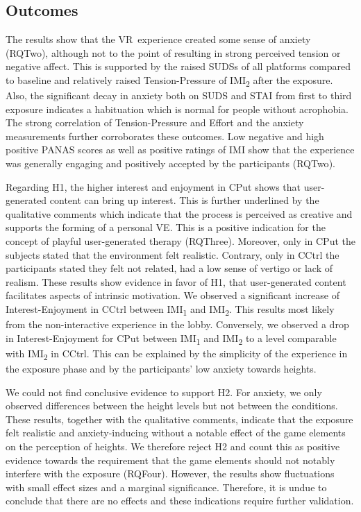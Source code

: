 \subsection{Outcomes}
The results show that the \ac{VR}~experience created some sense of anxiety (\acl{RQTwo}), although not to the point of resulting in strong perceived tension or negative affect.
This is supported by the raised SUDSs of all platforms compared to baseline and relatively raised Tension-Pressure of IMI\textsubscript{2} after the exposure.
Also, the significant decay in anxiety both on SUDS and STAI from first to third exposure indicates a habituation which is normal for people without acrophobia. 
The strong correlation of Tension-Pressure and Effort and the anxiety measurements further corroborates these outcomes.
Low negative and high positive PANAS scores as well as positive ratings of IMI show that the experience was generally engaging and positively accepted by the participants (\acl{RQTwo}).

Regarding H1, the higher interest and enjoyment in \acl{CPut} shows that user-generated content can bring up interest. This is further underlined by the qualitative comments which indicate that the process is perceived as creative and supports the forming of a personal \ac{VE}. This is a positive indication for the concept of playful user-generated therapy (\acl{RQThree}).
Moreover, only in \acl{CPut} the subjects stated that the environment felt realistic. Contrary, only in \acl{CCtrl} the participants stated they felt not related, had a low sense of vertigo or lack of realism.
These results show evidence in favor of H1, that user-generated content facilitates aspects of intrinsic motivation.
We observed a significant increase of Interest-Enjoyment in \acl{CCtrl} between IMI\textsubscript{1} and IMI\textsubscript{2}. This results most likely from the non-interactive experience in the lobby. Conversely, we observed a drop in Interest-Enjoyment for \acl{CPut} between IMI\textsubscript{1} and IMI\textsubscript{2} to a level comparable with IMI\textsubscript{2} in \acl{CCtrl}. This can be explained by the simplicity of the experience in the exposure phase and by the participants' low anxiety towards heights.


We could not find conclusive evidence to support H2. 
For anxiety, we only observed differences between the height levels but not between the conditions. These results, together with the  qualitative comments, indicate that the exposure felt realistic and anxiety-inducing without a notable effect of the game elements on the perception of heights. We therefore reject H2 and count this as positive evidence towards the requirement that the game elements should not notably interfere with the exposure (\acl{RQFour}).
However, the results show fluctuations with small effect sizes and a marginal significance. Therefore, it is undue to conclude that there are no effects and these indications require further validation.

